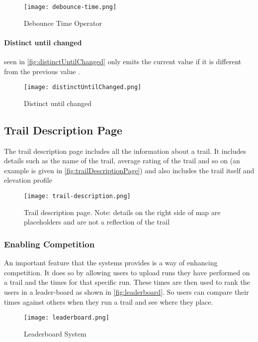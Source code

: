 \begin{figure}[htb!]
    \centering
    \texttt{[image: debounce-time.png]}
    \caption{Debounce Time Operator}
    \label{fig:debounceTime}
\end{figure}

\paragraph{Distinct until changed} seen in \autoref{fig:distinctUntilChanged} only emits the current value if it is different from the previous value \cite{leanrrxjs2019distinct}.
\begin{figure}[htb!]
    \centering
    \texttt{[image: distinctUntilChanged.png]}
    \caption{Distinct until changed}
    \label{fig:distinctUntilChanged}
\end{figure}

\subsection{Trail Description Page}
The trail description page includes all the information about a trail. It includes details such as the name of the trail, average rating of the trail and so on (an example is given in \autoref{fig:trailDescriptionPage}) and also includes the trail itself and elevation profile

\begin{figure}[htb!]
    \centering
    \texttt{[image: trail-description.png]}
    \caption{Trail description page. Note: details on the right side of map are placeholders and are not a reflection of the trail}
    \label{fig:trailDescriptionPage}
\end{figure}

\subsubsection{Enabling Competition}
An important feature that the systems provides is a way of enhancing competition. It does so by allowing users to upload runs they have performed on a trail and the times for that specific run. These times are then used to rank the users in a leader-board as shown in \autoref{fig:leaderboard}. So users can compare their times against others when they run a trail and see where they place. 

\begin{figure}[htb!]
    \centering
    \texttt{[image: leaderboard.png]}
    \caption{Leaderboard System}
    \label{fig:leaderboard}
\end{figure}

